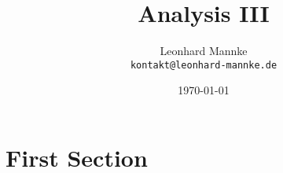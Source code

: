 \documentclass[12pt]{scrartcl}
\title{Analysis III} %
\author{Leonhard Mannke\\ \texttt{kontakt@leonhard-mannke.de}} %
\date{\today} %
\begin{document}
\maketitle %

\section{First Section}


\end{document}

